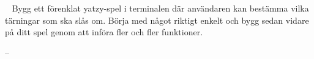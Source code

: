 
\QUESTBEGIN

\Task  \what~%
%
%
%
%
%
%
Bygg ett förenklat yatzy-spel i terminalen där användaren kan bestämma vilka tärningar som ska slås om. Börja med något riktigt enkelt och bygg sedan vidare på ditt spel genom att införa fler och fler funktioner.

\SOLUTION


\TaskSolved \what

 --


